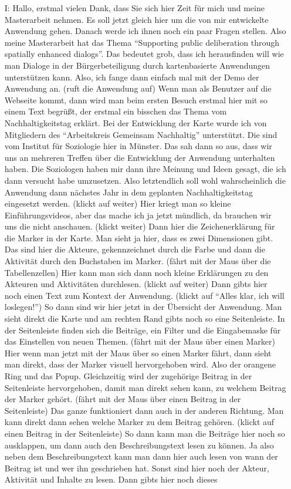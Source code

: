 \begin{itemize}
\item[I:] Hallo, erstmal vielen Dank, dass Sie sich hier Zeit f{\"u}r mich und meine Masterarbeit nehmen. Es soll jetzt gleich hier um die von mir entwickelte Anwendung gehen. Danach werde ich ihnen noch ein paar Fragen stellen. Also meine Masterarbeit hat das Thema "`Supporting public deliberation through spatially enhanced dialogs"'. Das bedeutet grob, dass ich herausfinden will wie man Dialoge in der B{\"u}rgerbeteiligung durch kartenbasierte Anwendungen unterst{\"u}tzen kann. Also, ich fange dann einfach mal mit der Demo der Anwendung an. (ruft die Anwendung auf) Wenn man als Benutzer auf die Webseite kommt, dann wird man beim ersten Besuch erstmal hier mit so einem Text begr{\"u}{\ss}t, der erstmal ein bisschen das Thema vom Nachhaltigkeitstag erkl{\"a}rt. Bei der Entwicklung der Karte wurde ich von Mitgliedern des "`Arbeitskreis Gemeinsam Nachhaltig"' unterst{\"u}tzt. Die sind vom Institut f{\"u}r Soziologie hier in M{\"u}nster. Das sah dann so aus, dass wir uns an mehreren Treffen {\"u}ber die Entwicklung der Anwendung unterhalten haben. Die Soziologen haben mir dann ihre Meinung und Ideen gesagt, die ich dann versucht habe umzusetzen. Also letztendlich soll wohl wahrscheinlich die Anwendung dann n{\"a}chstes Jahr in dem geplanten Nachhaltigkeitstag eingesetzt werden. (klickt auf weiter) Hier kriegt man so kleine Einf{\"u}hrungsvideos, aber das mache ich ja jetzt m{\"u}ndlich, da brauchen wir uns die nicht anschauen. (klickt weiter) Dann hier die Zeichenerkl{\"a}rung f{\"u}r die Marker in der Karte. Man sieht ja hier, dass es zwei Dimensionen gibt. Das sind hier die Akteure, gekennzeichnet durch die Farbe und dann die Aktivit{\"a}t durch den Buchstaben im Marker. (f{\"a}hrt mit der Maus {\"u}ber die Tabellenzellen) Hier kann man sich dann noch kleine Erkl{\"a}rungen zu den Akteuren und Aktivit{\"a}ten durchlesen. (klickt auf weiter) Dann gibts hier noch einen Text zum Kontext der Anwendung. (klickt auf "`Alles klar, ich will loslegen!"') So dann sind wir hier jetzt in der {\"U}bersicht der Anwendung. Man sieht direkt die Karte und am rechten Rand gibts noch so eine Seitenleiste. In der Seitenleiste finden sich die Beitr{\"a}ge, ein Filter und die Eingabemaske f{\"u}r das Einstellen von neuen Themen. (f{\"a}hrt mit der Maus {\"u}ber einen Marker) Hier wenn man jetzt mit der Maus {\"u}ber so einen Marker f{\"a}hrt, dann sieht man direkt, dass der Marker visuell hervorgehoben wird. Also der orangene Ring und das Popup. Gleichzeitig wird der zugeh{\"o}rige Beitrag in der Seitenleiste hervorgehoben, damit man direkt sehen kann, zu welchem Beitrag der Marker geh{\"o}rt. (f{\"a}hrt mit der Maus {\"u}ber einen Beitrag in der Seitenleiste) Das ganze funktioniert dann auch in der anderen Richtung. Man kann direkt dann sehen welche Marker zu dem Beitrag geh{\"o}ren. (klickt auf einen Beitrag in der Seitenleiste) So dann kann man die Beitr{\"a}ge hier noch so ausklappen, um dann auch den Beschreibungstext lesen zu k{\"o}nnen. Ja also neben dem Beschreibungstext kann man dann hier auch lesen von wann der Beitrag ist und wer ihn geschrieben hat. Sonst sind hier noch der Akteur, Aktivit{\"a}t und Inhalte zu lesen. Dann gibts hier noch dieses 
\end{itemize}
